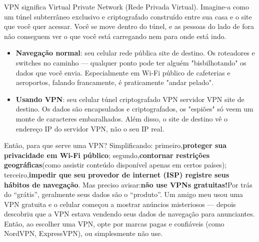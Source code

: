 


VPN significa Virtual Private Network (Rede Privada Virtual). Imagine-a como um túnel subterrâneo exclusivo e criptografado construído entre sua casa e o site que você quer acessar. Você se move dentro do túnel, e as pessoas do lado de fora não conseguem ver o que você está carregando nem para onde está indo.

\begin{itemize}
  \item \textbf{Navegação normal}: seu celular rede pública site de destino. Os roteadores e switches no caminho — qualquer ponto pode ter alguém "bisbilhotando" os dados que você envia. Especialmente em Wi-Fi público de cafeterias e aeroportos, falando francamente, é praticamente "andar pelado".
  \item \textbf{Usando VPN}: seu celular túnel criptografado VPN servidor VPN site de destino. Os dados são encapsulados e criptografados, os "espiões" só veem um monte de caracteres embaralhados. Além disso, o site de destino vê o endereço IP do servidor VPN, não o seu IP real.
\end{itemize}

Então, para que serve uma VPN? Simplificando: primeiro,\textbf{proteger sua privacidade em Wi-Fi público}; segundo,\textbf{contornar restrições geográficas}(como assistir conteúdo disponível apenas em certos países); terceiro,\textbf{impedir que seu provedor de internet (ISP) registre seus hábitos de navegação}. Mas preciso avisar:\textbf{não use VPNs gratuitas!}Por trás do “grátis”, geralmente seus dados são o “produto”. Um amigo meu usou uma VPN gratuita e o celular começou a mostrar anúncios misteriosos — depois descobriu que a VPN estava vendendo seus dados de navegação para anunciantes. Então, ao escolher uma VPN, opte por marcas pagas e confiáveis (como NordVPN, ExpressVPN), ou simplesmente não use.


